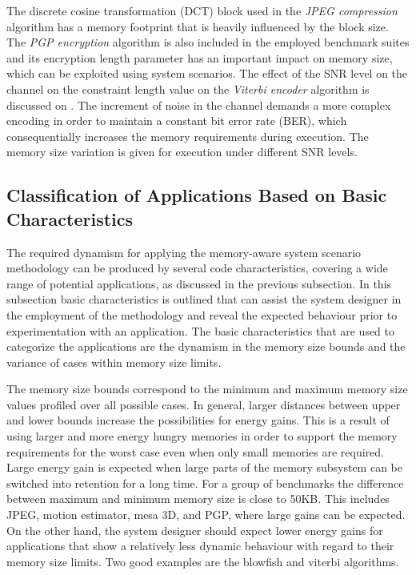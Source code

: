 \documentclass{acm_proc_article-sp}
\begin{document}
The discrete cosine transformation (DCT) block used in the \textit{JPEG compression} algorithm has a memory footprint that is heavily influenced by the block size. The \textit{PGP encryption} algorithm is also included in the employed benchmark suites and its encryption length parameter has an important impact on memory size, which can be exploited using system scenarios. The effect of the SNR level on the channel on the constraint length value on the \textit{Viterbi encoder} algorithm is discussed on \cite{Fil12}. The increment of noise in the channel demands a more complex encoding in order to maintain a constant bit error rate (BER), which consequentially increases the memory requirements during execution. The memory size variation is given for execution under different SNR levels.  

\subsection{Classification of Applications Based on Basic Characteristics}
\label{sec:categorisation}
The required dynamism for applying the memory-aware system scenario methodology can be produced by several code characteristics, covering a wide range of potential applications, as discussed in the previous subsection. In this subsection basic characteristics is outlined that can assist the system designer in the employment of the methodology and reveal the expected behaviour prior to experimentation with an application. The basic characteristics that are used to categorize the applications are the dynamism in the memory size bounds and the variance of cases within memory size limits.

The memory size bounds correspond to the minimum and maximum memory size values profiled over all possible cases. In general, larger distances between upper and lower bounds increase the possibilities for energy gains. This is a result of using larger and more energy hungry memories in order to support the memory requirements for the worst case even when only small memories are required. Large energy gain is expected when large parts of the memory subsystem can be switched into retention for a long time. For a group of benchmarks the difference between maximum and minimum memory size is close to 50KB. This includes JPEG, motion estimator, mesa 3D, and PGP, where large gains can be expected. On the other hand, the system designer should expect lower energy gains for applications that show a relatively less dynamic behaviour with regard to their memory size limits. Two good examples are the blowfish and viterbi algorithms. 
\end{document}
